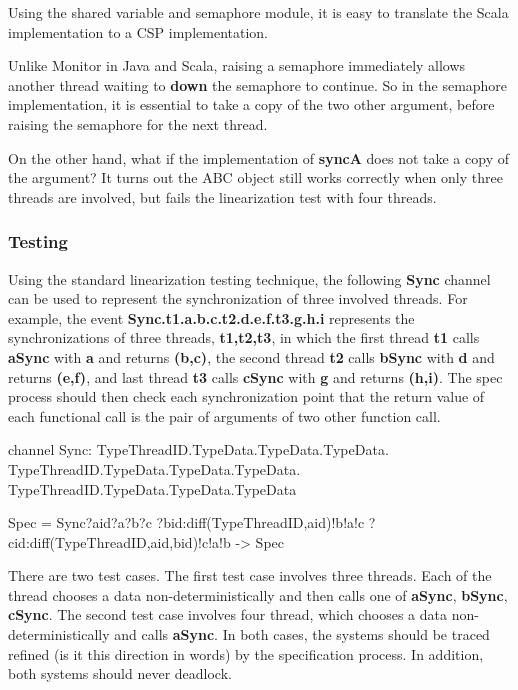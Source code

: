 \documentclass{article}
\begin{document}
Using the shared variable and semaphore module, it is easy to translate the Scala implementation to a CSP implementation. 

Unlike Monitor in Java and Scala, raising a semaphore immediately allows another thread waiting to \textbf{down} the semaphore to continue. So in the semaphore implementation, it is essential to take a copy of the two other argument, before raising the semaphore for the next thread. 

On the other hand, what if the implementation of \textbf{syncA} does not take a copy of the argument? It turns out the ABC object still works correctly when only three threads are involved, but fails the linearization test with four threads.

\subsubsection{Testing}
Using the standard linearization testing technique, the following \textbf{Sync} channel can be used to represent the synchronization of three involved threads. For example, the event \textbf{Sync.t1.a.b.c.t2.d.e.f.t3.g.h.i} represents the synchronizations of three threads, \textbf{t1,t2,t3}, in which the first thread \textbf{t1} calls \textbf{aSync} with \textbf{a} and returns \textbf{(b,c)}, the second thread \textbf{t2} calls \textbf{bSync} with \textbf{d} and returns \textbf{(e,f)}, and last thread \textbf{t3} calls \textbf{cSync} with \textbf{g} and returns \textbf{(h,i)}. The spec process should then check each synchronization point that the return value of each functional call is the pair of arguments of two other function call.

\begin{cspm}
channel Sync: TypeThreadID.TypeData.TypeData.TypeData.
              TypeThreadID.TypeData.TypeData.TypeData.
              TypeThreadID.TypeData.TypeData.TypeData

Spec = Sync?aid?a?b?c
           ?bid:diff(TypeThreadID,{aid})!b!a!c
           ?cid:diff(TypeThreadID,{aid,bid})!c!a!b 
    -> Spec
\end{cspm}

There are two test cases. The first test case involves three threads. Each of the thread chooses a data non-deterministically and then calls one of \textbf{aSync}, \textbf{bSync}, \textbf{cSync}. The second test case involves four thread, which chooses a data non-deterministically and calls \textbf{aSync}. In both cases, the systems should be traced refined (is it this direction in words) by the specification process. In addition, both systems should never deadlock.
\end{document}
